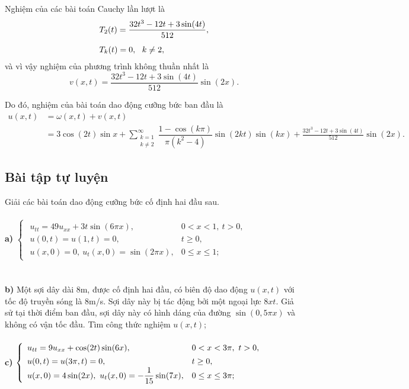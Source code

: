 \documentclass[10pt, a4paper]{article}
\begin{document}
	Nghiệm của các bài toán Cauchy lần lượt là \begin{align*}
		&T_2(t)=\frac{32t^3-12t+3\sin(4t)}{512},\\
		\noalign{\vskip5pt}
		&T_k(t)=0,~~k\ne2,
	\end{align*}
	và vì vậy nghiệm của phương trình không thuần nhất là $$v(x,t)=\frac{32t^3-12t+3\sin(4t)}{512}\sin(2x).$$
	
	Do đó, nghiệm của bài toán dao động cưỡng bức ban đầu là \begin{align*}
		u(x,t)&=\omega(x,t)+v(x,t)\\
		&=3\cos(2t)\sin x+\sum_{\substack{k=1\\k\ne2}}^\infty\dfrac{1-\cos(k\pi)}{\pi(k^2-4)}\sin(2kt)\sin(kx)+\frac{32t^3-12t+3\sin(4t)}{512}\sin(2x).
	\end{align*}
	\subsection{Bài tập tự luyện}
	Giải các bài toán dao động cưỡng bức cố định hai đầu sau.\\\\
	\textbf{a) } $\begin{cases}
		\begin{array}{ll}
			u_{tt}=49u_{xx}+3t\sin(6\pi x), & 0<x<1,~t>0,\\
			u(0,t)=u(1,t)=0, & t\ge0,\\
			u(x,0)=0,~u_t(x,0)=\sin(2\pi x), & 0\le x\le1;
		\end{array}
	\end{cases}$\\\\\\
	\textbf{b) }Một sợi dây dài 8m, được cố định hai đầu, có biên độ dao động $u(x,t)$ với tốc độ truyền sóng là 8m/s. Sợi dây này bị tác động bởi một ngoại lực $8xt$. Giả sử tại thời điểm ban đầu, sợi dây này có hình dáng của đường $\sin(0,5\pi x)$ và không có vận tốc đầu. Tìm công thức nghiệm $u(x,t)$;\\\\
	\textbf{c) } $\begin{cases}
		\begin{array}{ll}
			u_{tt}=9u_{xx}+\cos(2t)\sin(6x), & 0<x<3\pi,~t>0,\\
			\noalign{\vskip2pt}
			u(0,t)=u(3\pi,t)=0, & t\ge0,\\
			u(x,0)=4\sin(2x),~u_t(x,0)=-\dfrac{1}{15}\sin(7x), & 0\le x\le3\pi;
		\end{array}
	\end{cases}$\\\\\\
\end{document}

